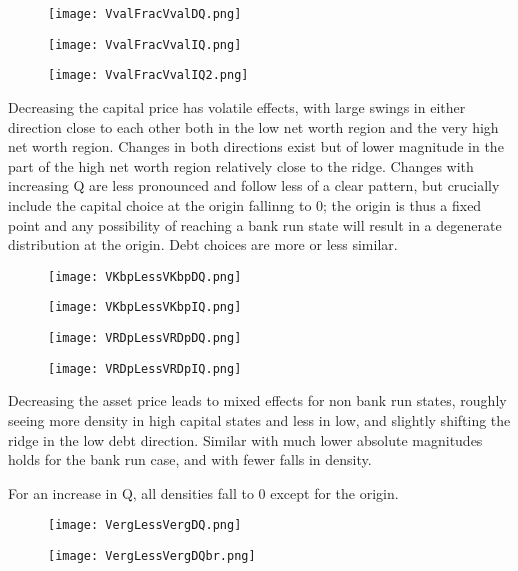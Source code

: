 \documentclass[english]{article}
\begin{document}
\begin{figure}[H]
\centering
		\texttt{[image: VvalFracVvalDQ.png]}
\end{figure}
\begin{figure}[H]
\centering
		\texttt{[image: VvalFracVvalIQ.png]}
\end{figure}
\begin{figure}[H]
\centering
		\texttt{[image: VvalFracVvalIQ2.png]}
\end{figure}

Decreasing the capital price has volatile effects, with large swings in either direction 
close to each other both in the low net worth region and the very high net worth region. 
Changes in both directions exist but of lower magnitude in the part of the high net worth 
region relatively close to the ridge. Changes with increasing Q are less pronounced and 
follow less of a clear pattern, but crucially include the capital choice at the origin fallinng to 0; 
the origin is thus a fixed point and any possibility of reaching a bank run state will result in 
a degenerate distribution at the origin. Debt choices are more or less similar.


\begin{figure}[H]
\centering
		\texttt{[image: VKbpLessVKbpDQ.png]}
\end{figure}
\begin{figure}[H]
\centering
		\texttt{[image: VKbpLessVKbpIQ.png]}
\end{figure}
\begin{figure}[H]
\centering
		\texttt{[image: VRDpLessVRDpDQ.png]}
\end{figure}
\begin{figure}[H]
\centering
		\texttt{[image: VRDpLessVRDpIQ.png]}
\end{figure}



Decreasing the asset price leads to mixed effects for non bank run states, roughly 
seeing more density in high capital states and less in low, and slightly shifting the ridge
in the low debt direction. Similar with much lower absolute magnitudes holds for the 
bank run case, and with fewer falls in density.

For an increase in Q, all densities fall to 0 except for the origin.


\begin{figure}[H]
\centering
		\texttt{[image: VergLessVergDQ.png]}
\end{figure}
\begin{figure}[H]
\centering
		\texttt{[image: VergLessVergDQbr.png]}
\end{figure}
\end{document}

